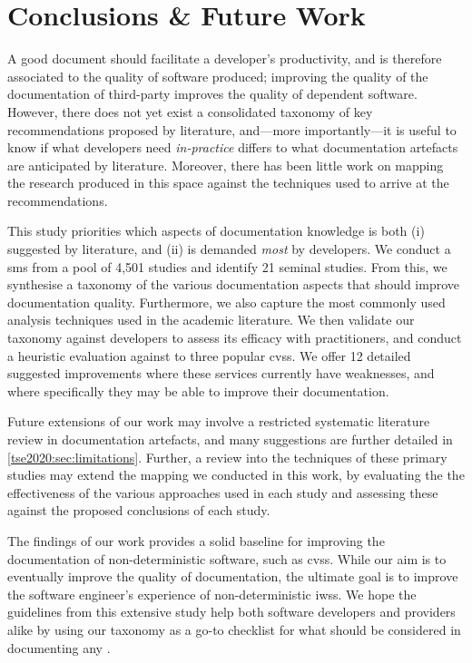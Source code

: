 \section{Conclusions \& Future Work}
\label{tse2020:sec:conclusions}

A good  document should facilitate a developer's productivity, and is therefore associated to the quality of software produced; improving the quality of the documentation of third-party  improves the quality of dependent software.
However, there does not yet exist a consolidated taxonomy of key recommendations proposed by literature, and---more importantly---it is useful to know if what developers need \textit{in-practice} differs to what documentation artefacts are anticipated by literature. Moreover, there has been little work on mapping the research produced in this space against the techniques used to arrive at the recommendations.

This study priorities which aspects of  documentation knowledge is both (i) suggested by literature, and (ii) is demanded \textit{most} by developers.
We conduct a \gls{sms} from a pool of 4,501 studies and identify 21 seminal studies. From this, we synthesise a taxonomy of the various documentation aspects that should improve  documentation quality. Furthermore, we also capture the most commonly used analysis techniques used in the academic literature. We then validate our taxonomy against developers to assess its efficacy with practitioners, and conduct a heuristic evaluation against to three popular \glspl{cvs}. We offer 12 detailed suggested improvements where these services currently have weaknesses, and where specifically they may be able to improve their documentation.

Future extensions of our work may involve a restricted systematic literature review in  documentation artefacts, and many suggestions are further detailed in \cref{tse2020:sec:limitations}. Further, a review into the techniques of these primary studies may extend the mapping we conducted in this work, by evaluating the the effectiveness of the various approaches used in each study and assessing these against the proposed conclusions of each study.

The findings of our work provides a solid baseline for improving the documentation of non-deterministic software, such as \glspl{cvs}. While our aim is to eventually improve the quality of  documentation, the ultimate goal is to improve the software engineer's experience of non-deterministic \glspl{iws}. We hope the guidelines from this extensive study help both software developers and  providers alike by using our taxonomy as a go-to checklist for what should be considered in documenting any .